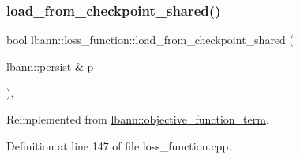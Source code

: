 \subsubsection{\texorpdfstring{load\+\_\+from\+\_\+checkpoint\+\_\+shared()}{load\_from\_checkpoint\_shared()}}
{\footnotesize\ttfamily bool lbann\+::loss\+\_\+function\+::load\+\_\+from\+\_\+checkpoint\+\_\+shared (\begin{DoxyParamCaption}\item[{\hyperlink{classlbann_1_1persist}{lbann\+::persist} \&}]{p }\end{DoxyParamCaption})\hspace{0.3cm}{\ttfamily [override]}, {\ttfamily [virtual]}}



Reimplemented from \hyperlink{classlbann_1_1objective__function__term_aac2240c9925c2b7bf436072a24f3eb30}{lbann\+::objective\+\_\+function\+\_\+term}.



Definition at line 147 of file loss\+\_\+function.\+cpp.


